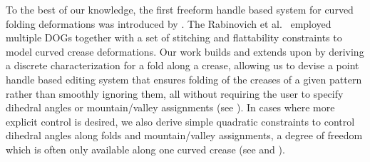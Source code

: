 To the best of our knowledge, the first freeform handle based system for curved folding deformations was introduced by \cite{rabi2018shape}.  The Rabinovich et al.~ employed multiple DOGs together with a set of stitching and flattability constraints to model curved crease deformations. Our work builds and extends upon \cite{rabi2018shape} by deriving a discrete characterization for a fold along a crease, allowing us to devise a point handle based editing system that ensures folding of the creases of a given pattern rather than smoothly ignoring them, all without requiring the user to specify dihedral angles or mountain/valley assignments (see ). In cases where more explicit control is desired, we also derive simple quadratic constraints to control dihedral angles along folds and mountain/valley assignments, a degree of freedom which is often only available along one curved crease (see  and ).